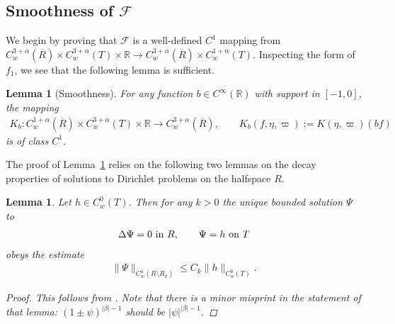 \documentclass[11pt,reqno]{amsart}
\newcommand\F{\mathcal F}
\newcommand{\maps}{\colon}
\newcommand{\R}{\mathbb{R}}
\newcommand{\abs}[2][]{#1\lvert #2 #1\rvert}
\theoremstyle{plain}
\newtheorem{lemma}[theorem]{Lemma}
\theoremstyle{remark}
\numberwithin{equation}{section}
\begin{document}
\subsection{Smoothness of \texorpdfstring{$\mathcal{F}$}{F}}

We begin by proving that $\F$ is a well-defined $C^1$ mapping from 
$C^{3+\alpha}_w(\overline R) \times C^{3+\alpha}_w(T) \times \R \to C^{3+\alpha}_w(\overline R)
\times C^{1+\alpha}_w(T)$. Inspecting the form of $f_1$, we see that the
following lemma is sufficient.
\begin{lemma}[Smoothness]\label{Ksmooth}
  For any function $b \in C^\infty(\R)$ with support in $[-1,0]$, the
  mapping
  \begin{align*}
    K_b \maps C^{1+\alpha}_w(\overline R) \times C^{3+\alpha}_w(T) \times \R 
    \to
    C^{3+\alpha}_w(\overline R),
    \qquad K_b(f,\eta,\varpi) 
    :=
    K(\eta,\varpi)(bf) 
  \end{align*}
  is of class $C^1$.  
\end{lemma}
The proof of Lemma~\ref{Ksmooth} relies on the following two lemmas on the decay properties of solutions to Dirichlet problems on the halfspace $R$.
\begin{lemma}\label{sunlemma}
  Let $h \in C^0_w(T)$. Then for any $k > 0$ the unique bounded
  solution $\Psi$ to 
  \begin{align*}
    \Delta \Psi = 0 \textup{~in~} R,
    \qquad 
    \Psi = h \textup{~on~} T
  \end{align*}
  obeys the estimate
  \begin{align*}
    \| \Psi \|_{C^4_w(R \setminus R_k)}
    \le C_k \| h \|_{C^0_w(T)}.
  \end{align*}
  \begin{proof}
    This follows from \cite[Lemma~3.1]{sun1997analytical}. Note that there is a minor misprint in the statement of that lemma:  $(1\pm \psi)^{\abs\beta-1}$ should be $\abs\psi^{\abs\beta-1}$. 
      \end{proof}
\end{lemma}
\end{document}
